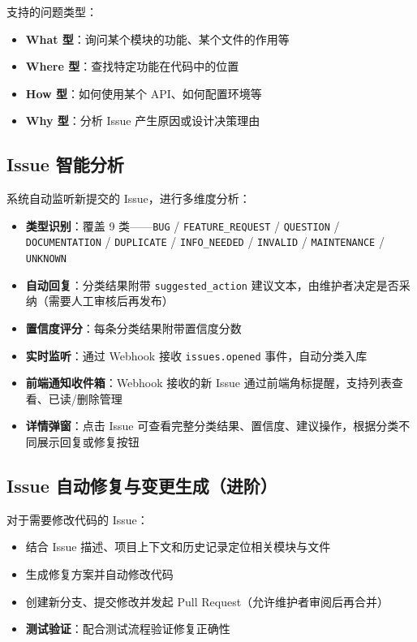 \documentclass[10pt,a4paper]{article}
\begin{document}
支持的问题类型：
\begin{itemize}
    \item \textbf{What 型}：询问某个模块的功能、某个文件的作用等
    \item \textbf{Where 型}：查找特定功能在代码中的位置
    \item \textbf{How 型}：如何使用某个 API、如何配置环境等
    \item \textbf{Why 型}：分析 Issue 产生原因或设计决策理由
\end{itemize}

\subsection{Issue 智能分析}

系统自动监听新提交的 Issue，进行多维度分析：

\begin{itemize}
    \item \textbf{类型识别}：覆盖 9 类——\texttt{BUG} / \texttt{FEATURE\_REQUEST} / \texttt{QUESTION} / \texttt{DOCUMENTATION} / \texttt{DUPLICATE} / \texttt{INFO\_NEEDED} / \texttt{INVALID} / \texttt{MAINTENANCE} / \texttt{UNKNOWN}
    \item \textbf{自动回复}：分类结果附带 \texttt{suggested\_action} 建议文本，由维护者决定是否采纳（需要人工审核后再发布）
    \item \textbf{置信度评分}：每条分类结果附带置信度分数
    \item \textbf{实时监听}：通过 Webhook 接收 \texttt{issues.opened} 事件，自动分类入库
    \item \textbf{前端通知收件箱}：Webhook 接收的新 Issue 通过前端角标提醒，支持列表查看、已读/删除管理
    \item \textbf{详情弹窗}：点击 Issue 可查看完整分类结果、置信度、建议操作，根据分类不同展示回复或修复按钮
\end{itemize}

\subsection{Issue 自动修复与变更生成（进阶）}
\label{sec:autofix}

对于需要修改代码的 Issue：

\begin{itemize}
    \item 结合 Issue 描述、项目上下文和历史记录定位相关模块与文件
    \item 生成修复方案并自动修改代码
    \item 创建新分支、提交修改并发起 Pull Request（允许维护者审阅后再合并）
    \item \textbf{测试验证}：配合测试流程验证修复正确性
\end{itemize}
\end{document}
